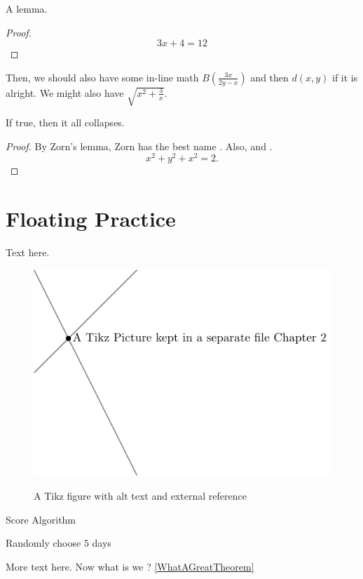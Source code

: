 \begin{lemma}
  A lemma.
\end{lemma}
\begin{proof}
  \[3x+4=12\]
\end{proof}

Then, we should also have some in-line math $B\left(\frac{3x}{2y-x}\right)$ and then $d(x,y)$ if it is alright. We might also have $\sqrt{x^2+\frac{3}{x}}$.

\begin{theorem}
  If true, then it all collapses.
  \label{WhatAGreatTheorem}
\end{theorem}
\begin{proof}
  By Zorn's lemma, Zorn has the best name \autocite{martiniCompleteReducedConvex2019}.
  Also, \autocite{chenGraphHomotopyGraham2001} and \autocite{dochtermannMinimalGraphsContractible2023}.
  \[x^2+y^2+x^2=2.\]

\end{proof}
\section{Floating Practice}
Text here.

\begin{figure}\centering
  \includegraphics[alt={two lines intersecting at a point}]{Images/tikzPic.pdf}
  \caption{A Tikz figure with alt text and external reference}
\end{figure}

\begin{algorithm}
  \caption{Score Algorithm}
  \begin{algorithmic}[1]
    \Statex
    \State Randomly choose $5$ days
    \EndFor
    \EndFor
  \end{algorithmic}
\end{algorithm}

More text here. Now what is we ?
\autoref{WhatAGreatTheorem}

\printbibliography[heading=subbibnumbered]

